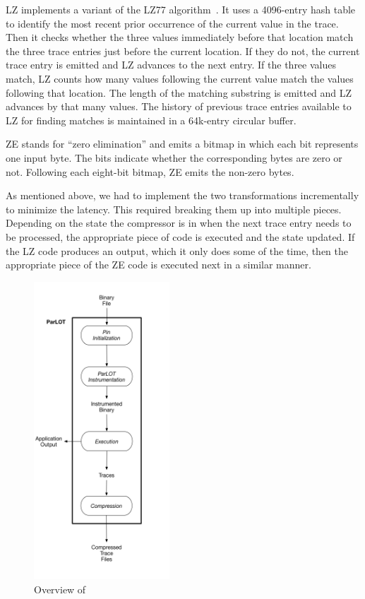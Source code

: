 LZ implements a variant of the LZ77 algorithm~\cite{LZ}. It uses a 4096-entry hash table to identify the most recent prior occurrence of the current value in the trace. Then it checks whether the three values immediately before that location match the three trace entries just before the current location. If they do not, the current trace entry is emitted and LZ advances to the next entry. If the three values match, LZ counts how many values following the current value match the values following that location. The length of the matching substring is emitted and LZ advances by that many values. The history of previous trace entries available to LZ for finding matches is maintained in a 64k-entry circular buffer. 

ZE stands for ``zero elimination'' and emits a bitmap in which each bit represents one input byte. The bits indicate whether the corresponding bytes are zero or not. Following each eight-bit bitmap, ZE emits the non-zero bytes.

As mentioned above, we had to implement the two transformations incrementally to minimize the latency. This required breaking them up into multiple pieces. Depending on the state the compressor is in when the next trace entry needs to be processed, the appropriate piece of code is executed and the state updated. If the LZ code produces an output, which it only does some of the time, then the appropriate piece of the ZE code is executed next in a similar manner.


\begin{figure}[!t]
\centering
\includegraphics[width=2in]{overview.png}
\caption{Overview of \parlot}
\label{overview}
\end{figure}


